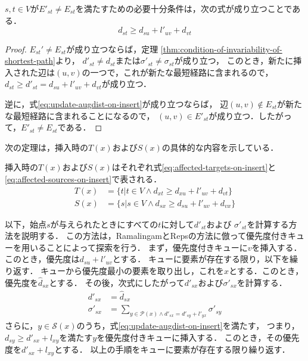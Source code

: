 \begin{lemma}
  \label{lmm:update-augdist-on-insert}
  $s,t\in V$が$E'_{st}\neq E_{st}$を満たすための必要十分条件は，次の式が成り立つことである．
  \begin{equation}
    d_{st}\geq d_{su}+l'_{uv}+d_{vt}
    \label{eq:update-augdist-on-insert}
  \end{equation}
\end{lemma}
\begin{proof}
  $E_{st}'\neq E_{st}$が成り立つならば，定理
  \ref{thm:condition-of-invariability-of-shortest-path}より，
  $d'_{st}\neq d_{st}$または$\sigma'_{st}\neq\sigma_{st}$が成り立つ，
  このとき，新たに挿入された辺は$(u,v)$の一つで，これが新たな最短経路に含まれるので，
  $d_{st}\geq d'_{st}=d_{su}+l'_{uv}+d_{vt}$が成り立つ．

  逆に，式\eqref{eq:update-augdist-on-insert}が成り立つならば，
  辺$(u,v)\notin E_{st}$が新たな最短経路に含まれることになるので，
  $(u,v)\in E'_{st}$が成り立つ．したがって，$E'_{st}\neq E_{st}$である．
\end{proof}

次の定理は，挿入時の$T(x)$および$S(x)$の具体的な内容を示している．
\begin{theorem}
  \label{thm:affected-vertices-on-insert}
  挿入時の$T(x)$および$S(x)$はそれぞれ式\eqref{eq:affected-targets-on-insert}と
  \eqref{eq:affected-sources-on-insert}で表される．
  \begin{align}
    T(x)&=\{t|t\in V\land d_{xt}\geq d_{xu}+l'_{uv}+d_{vt}\}
    \label{eq:affected-targets-on-insert} \\
    S(x)&=\{s|s\in V\land d_{sx}\geq d_{su}+l'_{uv}+d_{vx}\}
    \label{eq:affected-sources-on-insert}
  \end{align}
\end{theorem}

以下，始点$s$が与えられたときにすべての$t$に対して$d'_{st}$および
$\sigma'_{st}$を計算する方法を説明する．
この方法は，RamalingamとRepsの方法に倣って優先度付きキューを用いることによって探索を行う．
まず，優先度付きキューに$v$を挿入する．このとき，優先度は$d_{su}+l'_{uv}$とする．
キューに要素が存在する限り，以下を繰り返す．
キューから優先度最小の要素を取り出し，これを$x$とする．このとき，
優先度を$\hat{d}_{sx}$とする．
その後，次式にしたがって$d'_{sx}$および$\sigma'_{sx}$を計算する．
\begin{equation*}
  \begin{aligned}
    d'_{sx}&=\hat{d}_{sx} \\
    \sigma'_{sx}&=\sum_{y\in\mathcal{P}(x)\land d'_{sx}=d'_{sy}+l'_{yx}}\sigma'_{sy}
  \end{aligned}
\end{equation*}
さらに，$y\in\mathcal{S}(x)$のうち，式\eqref{eq:update-augdist-on-insert}を満たす，
つまり，$d_{sy}\geq d'_{sx}+l_{xy}$を満たす$y$を優先度付きキューに挿入する．
このとき，その優先度を$d'_{sx}+l_{xy}$とする．
以上の手順をキューに要素が存在する限り繰り返す．

